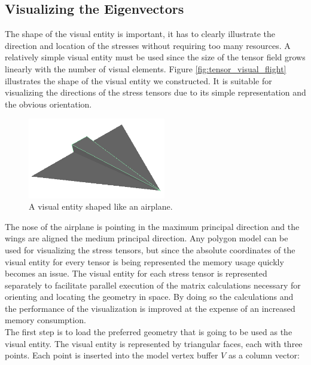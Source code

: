 \subsection{Visualizing the Eigenvectors}
The shape of the visual entity is important, it has to clearly illustrate the
direction and location of the stresses without requiring too many
resources. A relatively simple visual entity must be used since the size of
the tensor field grows linearly with the number of visual
elements. Figure \vref{fig:tensor_visual_flight} illustrates the shape
of the visual entity we constructed.
%
It is suitable
for visualizing the directions of the stress tensors due to its simple
representation and the obvious orientation. 

\begin{figure}
  \centering
  \includegraphics[width=6cm]{./images/helper_tools_tensor_flight.png}
\caption{A visual entity shaped like an airplane.}
\label{fig:tensor_visual_flight}
\end{figure}

The nose of the airplane is pointing in the maximum
principal direction and the wings are aligned the medium principal
direction.
%
Any polygon model can be used for visualizing the stress tensors, but
since the absolute coordinates of the visual entity for every tensor
is being represented the memory usage quickly becomes an issue. The visual
entity for each stress tensor is represented separately to facilitate parallel
execution of the matrix calculations necessary for orienting and
locating the geometry in space. By doing so the calculations and the
performance of the visualization is improved at the expense of an
increased memory consumption. \\

The first step is to load the preferred geometry that is going to
be used as the visual entity. The visual entity is represented by
triangular faces, each with three points. Each point is inserted into
the model vertex buffer $V$ as a column vector:

